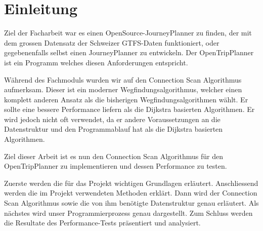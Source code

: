 \section{Einleitung}

Ziel der Facharbeit war es einen OpenSource-\gls{JourneyPlanner} zu finden, der mit dem grossen Datensatz der Schweizer GTFS-Daten funktioniert, oder gegebenenfalls selbst einen JourneyPlanner zu entwickeln. Der OpenTripPlanner ist ein Programm welches diesen Anforderungen entspricht. 

Während des Fachmoduls wurden wir auf den Connection Scan Algorithmus aufmerksam. Dieser ist ein moderner Wegfindungsalgorithmus, welcher einen komplett anderen Ansatz als die bisherigen Wegfindungsalgorithmen wählt. Er sollte eine bessere Performance liefern als die Dijkstra basierten Algorithmen. Er wird jedoch nicht oft verwendet, da er andere Voraussetzungen an die Datenstruktur und den Programmablauf hat als die Dijkstra basierten Algorithmen. 

Ziel dieser Arbeit ist es nun den Connection Scan Algorithmus für den OpenTripPlanner zu implementieren und dessen Performance zu testen.

Zuerste werden die für das Projekt wichtigen Grundlagen erläutert. Anschliessend werden die im Projekt verwendeten Methoden erklärt. Dann wird der Connection Scan Algorithmus sowie die von ihm benötigte Datenstruktur genau erläutert. Als nächstes wird unser Programmierprozess genau dargestellt. Zum Schluss werden die Resultate des Performance-Tests präsentiert und analysiert.